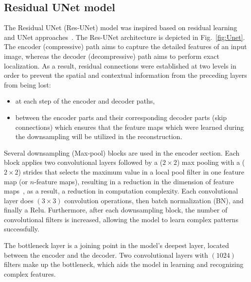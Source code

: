 \subsection{Residual UNet model}
\label{sec432}
The Residual UNet (Res-UNet) model was inspired based on residual learning~\cite{He2016} and UNet approaches~\cite{Ronneberger2015}.
The Res-UNet architecture is depicted in Fig.~\ref{fig:Unet}.
The encoder (compressive) path aims to capture the detailed features of an input image, whereas the decoder (decompressive) path aims to perform exact localization.
As a result, residual connections were established at two levels in order to prevent the spatial and contextual information from the preceding layers from being lost:

\begin{itemize}
	\item at each step of the encoder and decoder paths,
	\item between the encoder parts and their corresponding decoder parts (skip connections) which ensures that the feature maps which were learned during the downsampling will be utilized in the reconstruction. 
\end{itemize}

Several downsampling (Max-pool) blocks are used in the encoder section.
Each block applies two convolutional layers followed by a (\(2\times2\)) max pooling with a (\(2\times2\)) strides that selects the maximum value in a local pool filter in one feature map (or \(n\)-feature maps), resulting in a reduction in the dimension of feature maps~\cite{Lecun2015}, as a result, a reduction in computation complexity.
Each convolutional layer does \((3\times3)\) convolution operations, then batch normalization (BN), and finally a Relu.
Furthermore, after each downsampling block, the number of convolutional filters is increased, allowing the model to learn complex patterns successfully.

The bottleneck layer is a joining point in the model's deepest layer, located between the encoder and the decoder.
Two convolutional layers with \((1024)\) filters make up the bottleneck, which aids the model in learning and recognizing complex features.

